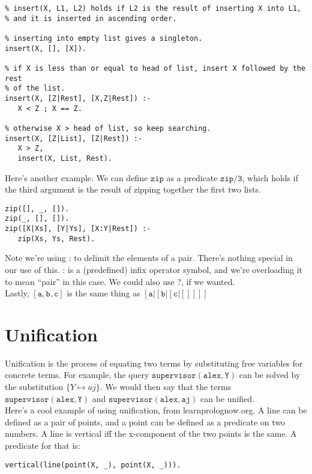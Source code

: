 \documentclass[a4paper,12pt]{article}
\newcommand{\kwa}[1]{\mathtt{#1}}
\begin{document}
\begin{lstlisting}
% insert(X, L1, L2) holds if L2 is the result of inserting X into L1,
% and it is inserted in ascending order.

% inserting into empty list gives a singleton.
insert(X, [], [X]).

% if X is less than or equal to head of list, insert X followed by the rest
% of the list.
insert(X, [Z|Rest], [X,Z|Rest]) :-
   X < Z ; X == Z.

% otherwise X > head of list, so keep searching.
insert(X, [Z|List], [Z|Rest]) :-
   X > Z,
   insert(X, List, Rest).
\end{lstlisting}

\noindent
Here's another example. We can define $\kwa{zip}$ as a predicate $\kwa{zip \slash 3}$, which holds if the third argument is the result of zipping together the first two lists.

\begin{lstlisting}
zip([], _, []).
zip(_, [], []).
zip([X|Xs], [Y|Ys], [X:Y|Rest]) :-
   zip(Xs, Ys, Rest).
\end{lstlisting}
   
\noindent
Note we're using : to delimit the elements of a pair. There's nothing special in our use of this. : is a (predefined) infix operator symbol, and we're overloading it to mean ``pair'' in this case. We could also use ?, if we wanted. \\

\noindent
Lastly, $\kwa{[a,b,c]}$ is the same thing as $\kwa{[a|[b|[c|[]]]]}$

\section{Unification}

\noindent
Unification is the process of equating two terms by substituting free variables for concrete terms. For example, the query $\kwa{supervisor(alex, Y)}$ can be solved by the substitution $\{ Y \mapsto aj \}$. We would then say that the terms $\kwa{supervisor(alex, Y)}$ and $\kwa{supervisor(alex, aj)}$ can be unified. \\

\noindent
Here's a cool example of using unification, from learnprolognow.org. A line can be defined as a pair of points, and a point can be defined as a predicate on two numbers. A line is vertical iff the x-component of the two points is the same. A predicate for that is:

\begin{lstlisting}
vertical(line(point(X, _), point(X, _))).
\end{lstlisting}
\end{document}
